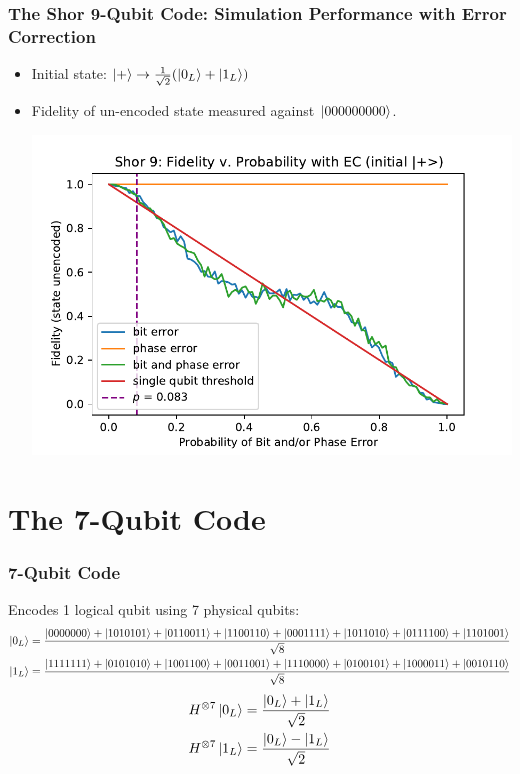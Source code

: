 \documentclass{beamer}
\begin{document}
\begin{frame}
    \frametitle{The Shor 9-Qubit Code: Simulation Performance with Error Correction}
    \begin{itemize}
        \item Initial state: $\left\vert{+}\right\rangle \rightarrow \frac{1}{\sqrt{2}}(\left\vert{0_L}\right\rangle+\left\vert{1_L}\right\rangle)$
        \item Fidelity of un-encoded state measured against $\left\vert{000000000}\right\rangle$.
        
        \centering\includegraphics[scale = 0.6]{shor9_pec.pdf}
    \end{itemize}
\end{frame}

\section{The 7-Qubit Code}
\begin{frame}
  \frametitle{7-Qubit Code}
  Encodes 1 logical qubit using 7 physical qubits:
  {\tiny
    \begin{align*}
      \left\vert{0_L}\right\rangle &= \frac{\left\vert{0000000}\right\rangle+\left\vert{1010101}\right\rangle+\left\vert{0110011}\right\rangle+\left\vert{1100110}\right\rangle+\left\vert{0001111}\right\rangle+\left\vert{1011010}\right\rangle+\left\vert{0111100}\right\rangle+\left\vert{1101001}\right\rangle}{\sqrt{8}} \\
      \left\vert{1_L}\right\rangle &= \frac{\left\vert{1111111}\right\rangle+\left\vert{0101010}\right\rangle+\left\vert{1001100}\right\rangle+\left\vert{0011001}\right\rangle+\left\vert{1110000}\right\rangle+\left\vert{0100101}\right\rangle+\left\vert{1000011}\right\rangle+\left\vert{0010110}\right\rangle}{\sqrt{8}}
    \end{align*}
    \begin{align*}
      H^{\otimes 7}\left\vert{0_L}\right\rangle &= \frac{\left\vert{0_L}\right\rangle+\left\vert{1_L}\right\rangle}{\sqrt{2}} \\
      H^{\otimes 7}\left\vert{1_L}\right\rangle &= \frac{\left\vert{0_L}\right\rangle-\left\vert{1_L}\right\rangle}{\sqrt{2}}
    \end{align*}
  }
\end{frame}
\end{document}
